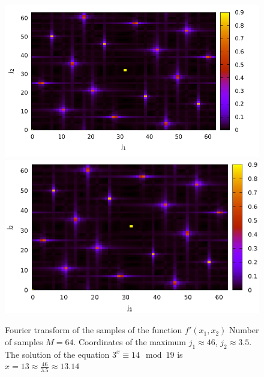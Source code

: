 \begin{figure}
\centering

\ifpdf
\includegraphics[angle=0]
{./part4/quantcomp/picdiscretlog3.pdf}
\else
\includegraphics[angle=0]
{./part4/quantcomp/picdiscretlog3.eps}
\fi

%

\caption{Fourier transform of the samples of the function 
$f'(x_1, x_2)$
Number of samples $M=64$. Coordinates of the maximum $j_1 \approx 46$, $j_2 \approx 3.5$. 
The solution of the equation $3^x \equiv 14 \mod 19$
is $x = 13 \approx \frac{46}{3.5} \approx 13.14$
} 
\label{fig:part4:quantcomp:dl3}
\end{figure}